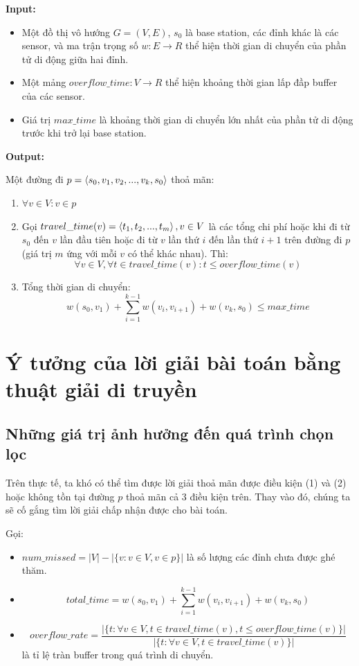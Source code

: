 \documentclass[12pt]{report}
\begin{document}
\textbf{Input:} 
\begin{itemize}
\item Một đồ thị vô hướng $G=(V, E)$, $s_0$ là base station, các đỉnh khác là các sensor, và ma trận trọng số $w: E \rightarrow R$ thể hiện thời gian di chuyển của phần tử di động giữa hai đỉnh.
\item Một mảng $overflow\_time: V \rightarrow R$ thể hiện khoảng thời gian lấp đầp buffer của các sensor.  
\item Giá trị $max\_time$ là khoảng thời gian di chuyển lớn nhất của phần tử di động trước khi trở lại base station. 
\end{itemize}

\textbf{Output:} 

Một đường đi $p=\braket{s_0, v_1, v_2, ..., v_k, s_0}$ thoả mãn: 
\begin{enumerate}
\item $\forall v \in V: v \in p$
\item Gọi $travel\_time(v) = \braket{t_1, t_2, ..., t_m}, v \in V$ là các tổng chi phí hoặc khi đi từ $s_0$ đến $v$ lần đầu tiên hoặc đi từ $v$ lần thứ $i$ đến lần thứ $i + 1$ trên đường đi $p$ (giá trị $m$ ứng với mỗi $v$ có thể khác nhau). Thì: 
	$$\forall v \in V, \forall t \in travel\_time(v): t \leq overflow\_time(v) $$
\item Tổng thời gian di chuyển:
	$$w(s_0, v_1) + \sum_{i = 1} ^ {k - 1} w(v_i, v_{i + 1}) + w(v_k, s_0) \leq max\_time$$
\end{enumerate}

\section{Ý tưởng của lời giải bài toán bằng thuật giải di truyền}
\subsection{Những giá trị ảnh hưởng đến quá trình chọn lọc}
Trên thực tế, ta khó có thể tìm được lời giải thoả mãn được điều kiện (1) và (2) hoặc không tồn tại đường $p$ thoả mãn cả 3 điều kiện trên. Thay vào đó, chúng ta sẽ cố gắng tìm lời giải chấp nhận được cho bài toán.

\vspace{5mm}
Gọi:
\begin{itemize}
\item $num\_missed = |V| - |\{v: v \in V, v \in p\}|$ là số lượng các đỉnh chưa được ghé thăm. 
\item $$total\_time = w(s_0, v_1) + \sum_{i = 1} ^ {k - 1} w(v_i, v_{i + 1}) + w(v_k, s_0)$$
\item $$overflow\_rate = \frac{|\{t: \forall v \in V, t \in travel\_time(v), t \leq overflow\_time(v)\}| }{|\{t: \forall v \in V, t \in travel\_time(v)\}|}$$ là tỉ lệ tràn buffer trong quá trình di chuyển. 
\end{itemize}
\end{document}
